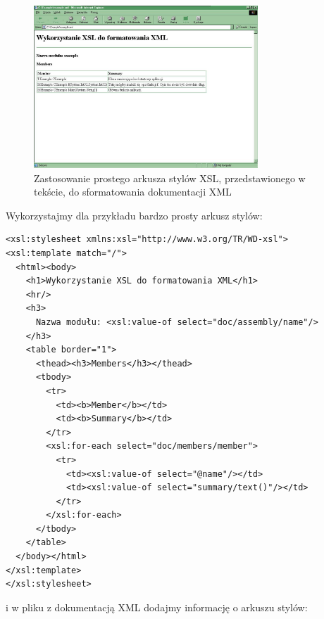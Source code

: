 \begin{figure}
\begin{center}
\includegraphics[width=0.75\textwidth]{./pic/w03}
\caption{Zastosowanie prostego arkusza stylów XSL, przedstawionego w tekście, do sformatowania dokumentacji XML}
\end{center}
\end{figure}

Wykorzystajmy dla przykładu bardzo prosty arkusz stylów:

\begin{scriptsize}
\begin{verbatim}
<xsl:stylesheet xmlns:xsl="http://www.w3.org/TR/WD-xsl">
<xsl:template match="/">
  <html><body>
    <h1>Wykorzystanie XSL do formatowania XML</h1>
    <hr/>
    <h3>
      Nazwa modułu: <xsl:value-of select="doc/assembly/name"/>
    </h3>
    <table border="1">
      <thead><h3>Members</h3></thead>
      <tbody>
        <tr>
          <td><b>Member</b></td>
          <td><b>Summary</b></td>
        </tr>
        <xsl:for-each select="doc/members/member">
          <tr>
            <td><xsl:value-of select="@name"/></td>
            <td><xsl:value-of select="summary/text()"/></td>
          </tr>
        </xsl:for-each>
      </tbody>
    </table>
  </body></html>
</xsl:template>
</xsl:stylesheet>
\end{verbatim}
\end{scriptsize}

i w pliku z dokumentacją XML dodajmy informację o arkuszu stylów:

